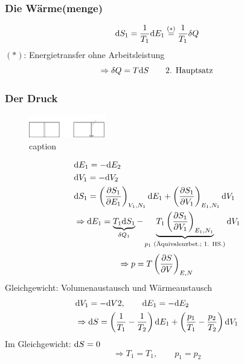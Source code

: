 \subsubsection{Die Wärme(menge)}
\begin{equation}
    \mathrm{d} S_1 = \frac{1}{T_1} \mathrm{d} E_1 \overset{(*)}{=} \frac{1}{T_1} \delta Q
\end{equation}
$(*)$: Energietransfer ohne Arbeitsleistung
\begin{equation}
    \Rightarrow \delta Q = T \mathrm{d} S \qquad \text{2. Hauptsatz}
\end{equation}
\subsubsection{Der Druck}
\begin{figure}[H]
    \begin{center}
        \includegraphics[width=0.3\textwidth]{../img/derivationP.pdf}
        \caption{caption}  %
        \label{img:derivatoinP}
    \end{center}
\end{figure}
\begin{equation}
    \begin{split}
        & \mathrm{d} E_1 = - \mathrm{d} E_2 \\
        & \mathrm{d} V_1 = - \mathrm{d} V_2 \\
        & \mathrm{d} S_1 = \left( \frac{\partial S_1}{\partial E_1} \right)_{V_1, N_1} \mathrm{d} E_1 + \left( \frac{\partial S_1}{\partial V_1} \right)_{E_1, N_1} \mathrm{d} V_1 \\
        & \Rightarrow \mathrm{d} E_1 = \underbrace{T_1 \mathrm{d} S_1}_{\delta Q_1} - \underbrace{T_1 \left( \frac{\partial S_1}{\partial V_1} \right)_{E_1, N_1}}_{p_1 \text{ (Äquivalenzbet.; 1. HS.)}} \mathrm{d} V_1
    \end{split}
\end{equation}
\begin{equation}
    \Rightarrow p = T \left( \frac{\partial S}{\partial V} \right)_{E, N}
\end{equation}
Gleichgewicht: Volumenaustausch und Wärmeaustausch
\begin{equation}
    \begin{split}
        & \mathrm{d} V_1 = - \mathrm{d} V2, \qquad \mathrm{d} E_1 = - \mathrm{d} E_2 \\
        & \Rightarrow \mathrm{d} S = \left( \frac{1}{T_1} - \frac{1}{T_2} \right) \mathrm{d} E_1 + \left( \frac{p_1}{T_1} - \frac{p_2}{T_2} \right) \mathrm{d} V_1
    \end{split}
\end{equation}
Im Gleichgewicht: $\mathrm{d} S = 0$
\begin{equation}
    \Rightarrow T_1 = T_1 , \qquad p_1 = p_2
\end{equation}
